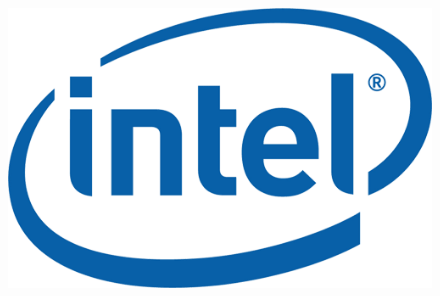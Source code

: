 \documentclass[letterpaper]{jm-cv} %
\begin{document}
\begin{figure}
\includegraphics[scale=0.12]{logo-intel.png}
\end{figure}
\end{document}
